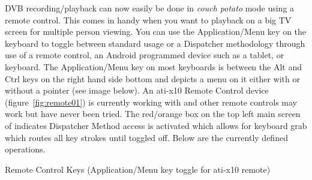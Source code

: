 \CGG{} DVB recording/playback can now easily be done in \textit{couch potato} mode using a remote control.  This comes in handy when you want to playback on a big TV screen for multiple person viewing. You can use the Application/Menu key on the keyboard to toggle between standard \CGG{} usage or a Dispatcher methodology through use of a remote control, an Android programmed device such as a tablet, or keyboard. The Application/Menu key on most keyboards is between the Alt and Ctrl keys on the right hand side bottom and depicts a menu on it either with or without a pointer (see image below).  An ati-x10 Remote Control device (figure~\ref{fig:remote01}) is currently working with \CGG{} and other remote controls may work but have never been tried.  The red/orange box on the top left main screen of \CGG{}  indicates Dispatcher Method access is activated which allows for keyboard grab which routes all key strokes until toggled off.  Below are the currently defined operations.
\newline

Remote Control Keys (Application/Menu key toggle for ati-x10 remote)


